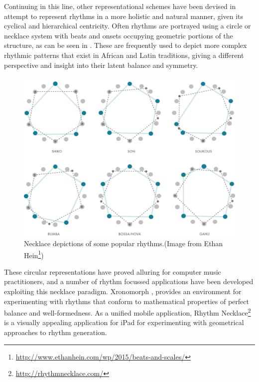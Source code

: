 Continuing in this line, other representational schemes have been devised in attempt to represent rhythms in a more holistic and natural manner, given its cyclical and hierarchical centricity. Often rhythms are portrayed using a circle or necklace system with beats and onsets occupying geometric portions of the structure, as can be seen in . These are frequently used to depict more complex rhythmic patterns that exist in African and Latin traditions, giving a different perspective and insight into their latent balance and symmetry.

\begin{figure}
	\begin{center}
		\includegraphics[width=\figSizeHundred]{ch03_symbolic/figures/necklace.jpg}
	\end{center}
	\caption[Necklace depictions of some popular rhythms.]{Necklace depictions of some popular rhythms.(Image from Ethan Hein\footnote{\url{http://www.ethanhein.com/wp/2015/beats-and-scales/}})}
	\label{fig:necklace}
\end{figure}

These circular representations have proved alluring for computer music practitioners, and a number of rhythm focussed applications have been developed exploiting this necklace paradigm. Xronomorph \citep{Milne2015a, Milne2016}, provides an environment for experimenting with rhythms that conform to mathematical properties of perfect balance and well-formedness. As a unified mobile application, Rhythm Necklace\footnote{\url{http://rhythmnecklace.com/}} is a visually appealing application for iPad for experimenting with geometrical approaches to rhythm generation.


